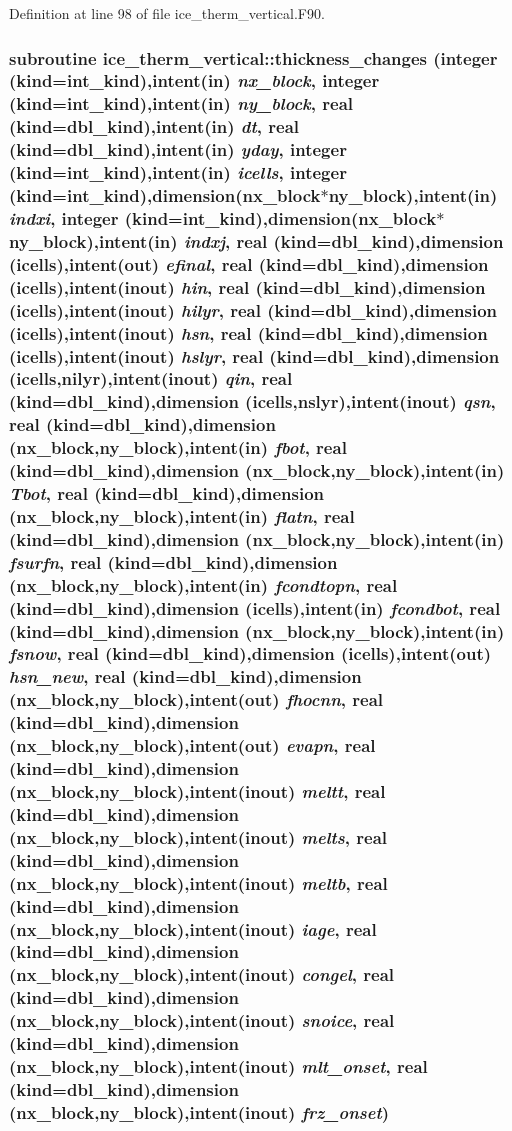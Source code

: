 Definition at line 98 of file ice\_\-therm\_\-vertical.F90.\hypertarget{namespaceice__therm__vertical_ad24b5fda2cb4af3cda6722209668aa77}{
\subsubsection[{thickness\_\-changes}]{\setlength{\rightskip}{0pt plus 5cm}subroutine ice\_\-therm\_\-vertical::thickness\_\-changes (integer (kind=int\_\-kind),intent(in) {\em nx\_\-block}, \/  integer (kind=int\_\-kind),intent(in) {\em ny\_\-block}, \/  real (kind=dbl\_\-kind),intent(in) {\em dt}, \/  real (kind=dbl\_\-kind),intent(in) {\em yday}, \/  integer (kind=int\_\-kind),intent(in) {\em icells}, \/  integer (kind=int\_\-kind),dimension(nx\_\-block$\ast$ny\_\-block),intent(in) {\em indxi}, \/  integer (kind=int\_\-kind),dimension(nx\_\-block$\ast$ny\_\-block),intent(in) {\em indxj}, \/  real (kind=dbl\_\-kind),dimension (icells),intent(out) {\em efinal}, \/  real (kind=dbl\_\-kind),dimension (icells),intent(inout) {\em hin}, \/  real (kind=dbl\_\-kind),dimension (icells),intent(inout) {\em hilyr}, \/  real (kind=dbl\_\-kind),dimension (icells),intent(inout) {\em hsn}, \/  real (kind=dbl\_\-kind),dimension (icells),intent(inout) {\em hslyr}, \/  real (kind=dbl\_\-kind),dimension (icells,nilyr),intent(inout) {\em qin}, \/  real (kind=dbl\_\-kind),dimension (icells,nslyr),intent(inout) {\em qsn}, \/  real (kind=dbl\_\-kind),dimension (nx\_\-block,ny\_\-block),intent(in) {\em fbot}, \/  real (kind=dbl\_\-kind),dimension (nx\_\-block,ny\_\-block),intent(in) {\em Tbot}, \/  real (kind=dbl\_\-kind),dimension (nx\_\-block,ny\_\-block),intent(in) {\em flatn}, \/  real (kind=dbl\_\-kind),dimension (nx\_\-block,ny\_\-block),intent(in) {\em fsurfn}, \/  real (kind=dbl\_\-kind),dimension (nx\_\-block,ny\_\-block),intent(in) {\em fcondtopn}, \/  real (kind=dbl\_\-kind),dimension (icells),intent(in) {\em fcondbot}, \/  real (kind=dbl\_\-kind),dimension (nx\_\-block,ny\_\-block),intent(in) {\em fsnow}, \/  real (kind=dbl\_\-kind),dimension (icells),intent(out) {\em hsn\_\-new}, \/  real (kind=dbl\_\-kind),dimension (nx\_\-block,ny\_\-block),intent(out) {\em fhocnn}, \/  real (kind=dbl\_\-kind),dimension (nx\_\-block,ny\_\-block),intent(out) {\em evapn}, \/  real (kind=dbl\_\-kind),dimension (nx\_\-block,ny\_\-block),intent(inout) {\em meltt}, \/  real (kind=dbl\_\-kind),dimension (nx\_\-block,ny\_\-block),intent(inout) {\em melts}, \/  real (kind=dbl\_\-kind),dimension (nx\_\-block,ny\_\-block),intent(inout) {\em meltb}, \/  real (kind=dbl\_\-kind),dimension (nx\_\-block,ny\_\-block),intent(inout) {\em iage}, \/  real (kind=dbl\_\-kind),dimension (nx\_\-block,ny\_\-block),intent(inout) {\em congel}, \/  real (kind=dbl\_\-kind),dimension (nx\_\-block,ny\_\-block),intent(inout) {\em snoice}, \/  real (kind=dbl\_\-kind),dimension (nx\_\-block,ny\_\-block),intent(inout) {\em mlt\_\-onset}, \/  real (kind=dbl\_\-kind),dimension (nx\_\-block,ny\_\-block),intent(inout) {\em frz\_\-onset})}}
\label{namespaceice__therm__vertical_ad24b5fda2cb4af3cda6722209668aa77}


